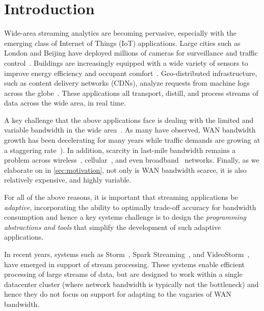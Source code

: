 \section{Introduction}

Wide-area streaming analytics are becoming pervasive, especially with the
emerging class of Internet of Things (IoT) applications.  Large cities such as
London and Beijing have deployed millions of cameras for surveillance and
traffic control~\cite{skynet, london.surveillance}. Buildings are increasingly
equipped with a wide variety of sensors to improve energy efficiency and
occupant comfort~\cite{krioukov2012building}. Geo-distributed infrastructure,
such as content delivery networks (CDNs), analyze requests from machine logs
across the globe~\cite{mukerjee2015practical}. These applications all transport,
distill, and process streams of data across the wide area, in real time.

A key challenge that the above applications face is dealing with the limited and
variable bandwidth in the wide area~\cite{hsieh17gaia, vulimiri2015global}.  As
many have observed, WAN bandwidth growth has been decelerating for many years
while traffic demands are growing at a staggering
rate~\cite{global2016telegeography, cisco2013zettabyte, pu2015low,
  cisco2016global}).  In addition, scarcity in last-mile bandwidth remains a
problem across wireless~\cite{biswas2015large},
cellular~\cite{nikravesh2014mobile}, and even broadband~\cite{grover2013peeking,
  sundaresan2014bismark} networks.  Finally, as we elaborate on in
\autoref{sec:motivation}, not only is WAN bandwidth scarce, it is also
relatively expensive, and highly variable.

For all of the above reasons, it is important that streaming applications be
\emph{adaptive}, incorporating the ability to optimally trade-off accuracy for
bandwidth consumption and hence a key systems challenge is to design the
\emph{programming abstractions and tools} that simplify the development of such
adaptive applications.

In recent years, systems such as Storm~\cite{toshniwal2014storm}, Spark
Streaming~\cite{zaharia2013discretized}, and VideoStorm~\cite{zhang2017live},
have emerged in support of stream processing.  These systems enable efficient
processing of large streams of data, but are designed to work within a single
datacenter cluster (where network bandwidth is typically not the bottleneck) and
hence they do not focus on support for adapting to the vagaries of WAN
bandwidth.


